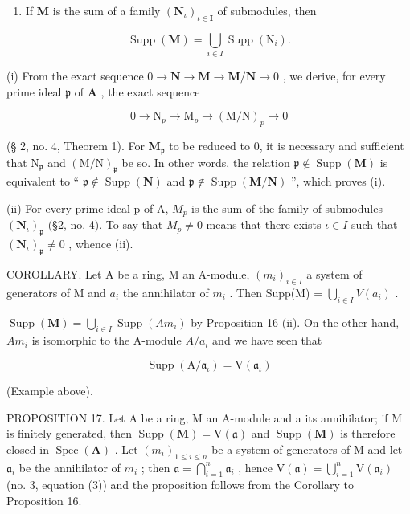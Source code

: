 \begin{enumerate}
\def\labelenumi{(\roman{enumi})}
\setcounter{enumi}{1}
\tightlist
\item
  If \(\mathbf{M}\) is the sum of a family \((\mathbf{N}_{\iota})_{\iota \in \mathbf{I}}\) of submodules, then
\end{enumerate}

\[
\operatorname{Supp} (\mathbf {M}) = \bigcup_ {i \in I} \operatorname{Supp} \left(\mathrm{N} _ {i}\right).
\]

(i) From the exact sequence \(0 \to \mathbf{N} \to \mathbf{M} \to \mathbf{M} / \mathbf{N} \to 0\) , we derive, for every prime ideal \(\mathfrak{p}\) of \(\mathbf{A}\) , the exact sequence

\[
0 \rightarrow \mathrm{N} _ {p} \rightarrow \mathrm{M} _ {p} \rightarrow (\mathrm{M} / \mathrm{N}) _ {p} \rightarrow 0
\]

(§ 2, no. 4, Theorem 1). For \(\mathbf{M}_{\mathfrak{p}}\) to be reduced to 0, it is necessary and sufficient that \(\mathrm{N}_{\mathfrak{p}}\) and \((\mathrm{M} / \mathrm{N})_{\mathfrak{p}}\) be so. In other words, the relation \(\mathfrak{p} \notin \operatorname{Supp}(\mathbf{M})\) is equivalent to `` \(\mathfrak{p} \notin \operatorname{Supp}(\mathbf{N})\) and \(\mathfrak{p} \notin \operatorname{Supp}(\mathbf{M} / \mathbf{N})\) '', which proves (i).

(ii) For every prime ideal p of A, \(M_{p}\) is the sum of the family of submodules \((\mathbf{N}_{\iota})_{\mathfrak{p}}\) (§2, no. 4). To say that \(M_{p} \neq 0\) means that there exists \(\iota \in I\) such that \((\mathbf{N}_{\iota})_{\mathfrak{p}} \neq 0\) , whence (ii).

COROLLARY. Let A be a ring, M an A-module, \((m_{i})_{i\in I}\) a system of generators of M and \(a_{i}\) the annihilator of \(m_{i}\) . Then Supp(M) = \(\bigcup_{i\in I} V(a_{i})\) .

\(\operatorname{Supp}(\mathbf{M}) = \bigcup_{i \in I} \operatorname{Supp}(Am_i)\) by Proposition 16 (ii). On the other hand, \(Am_i\) is isomorphic to the A-module \(A/a_i\) and we have seen that

\[
\operatorname{Supp} (\mathrm{A} / \mathfrak {a} _ {\iota}) = \mathrm{V} (\mathfrak {a} _ {\iota})
\]

(Example above).

PROPOSITION 17. Let A be a ring, M an A-module and a its annihilator; if M is finitely generated, then \(\operatorname{Supp}(\mathbf{M}) = \mathrm{V}(\mathfrak{a})\) and \(\operatorname{Supp}(\mathbf{M})\) is therefore closed in \(\operatorname{Spec}(\mathbf{A})\) . Let \((m_i)_{1 \leqslant i \leqslant n}\) be a system of generators of M and let \(\mathfrak{a}_i\) be the annihilator of \(m_i\) ; then \(\mathfrak{a} = \bigcap_{i=1}^{n} \mathfrak{a}_i\) , hence \(\mathrm{V}(\mathfrak{a}) = \bigcup_{i=1}^{n} \mathrm{V}(\mathfrak{a}_i)\) (no. 3, equation (3)) and the proposition follows from the Corollary to Proposition 16.

